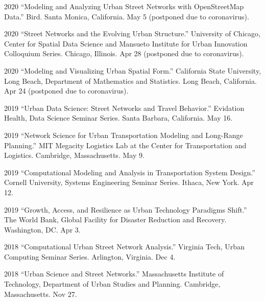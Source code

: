 \documentclass[12pt,letterpaper]{report}
\begin{document}
    \begin{tablist}
    	
    	\item[2020] \tab \enquote{Modeling and Analyzing Urban Street Networks with OpenStreetMap Data.} Bird. Santa Monica, California. May 5 (postponed due to coronavirus).
		
		\item[2020] \tab \enquote{Street Networks and the Evolving Urban Structure.} University of Chicago, Center for Spatial Data Science and Mansueto Institute for Urban Innovation Colloquium Series. Chicago, Illinois. Apr 28 (postponed due to coronavirus).
		
		\item[2020] \tab \enquote{Modeling and Visualizing Urban Spatial Form.} California State University, Long Beach, Department of Mathematics and Statistics. Long Beach, California. Apr 24 (postponed due to coronavirus).
		
        \item[2019] \tab \enquote{Urban Data Science: Street Networks and Travel Behavior.} Evidation Health, Data Science Seminar Series. Santa Barbara, California. May 16.
        
        \item[2019] \tab \enquote{Network Science for Urban Transportation Modeling and Long-Range Planning.} MIT Megacity Logistics Lab at the Center for Transportation and Logistics. Cambridge, Massachusetts. May 9.

        \item[2019] \tab \enquote{Computational Modeling and Analysis in Transportation System Design.} Cornell University, Systems Engineering Seminar Series. Ithaca, New York. Apr 12.

        \item[2019] \tab \enquote{Growth, Access, and Resilience as Urban Technology Paradigms Shift.} The World Bank, Global Facility for Disaster Reduction and Recovery. Washington, DC. Apr 3.

        \item[2018] \tab \enquote{Computational Urban Street Network Analysis.} Virginia Tech, Urban Computing Seminar Series. Arlington, Virginia. Dec 4.

        \item[2018] \tab \enquote{Urban Science and Street Networks.} Massachusetts Institute of Technology, Department of Urban Studies and Planning. Cambridge, Massachusetts. Nov 27.
        

\end{tablist}
\end{document}

